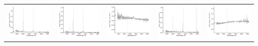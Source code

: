 \begin{center}
\begin{longtable}{l l l l l }
    \includegraphics[width=0.2\linewidth, clip]{Figs/Figs-sdss/spec-0530-52026-0013-SPLUS-n02n44-027436.pdf} & \includegraphics[width=0.2\linewidth, clip]{Figs/Figs-sdss/spec-0572-52289-0114-SPLUS-n04n01-004018.pdf} & \includegraphics[width=0.2\linewidth, clip]{Figs/Figs-sdss/spec-0573-52325-0471-SPLUS-n04n01-030147.pdf} & \includegraphics[width=0.2\linewidth, clip]{Figs/Figs-sdss/spec-0584-52049-0618-SPLUS-n05n50-017121.pdf} & \includegraphics[width=0.2\linewidth, clip]{Figs/Figs-sdss/spec-0669-52559-0359-STRIPE82-0004-022337.pdf} \\

\end{longtable}
\end{center}
